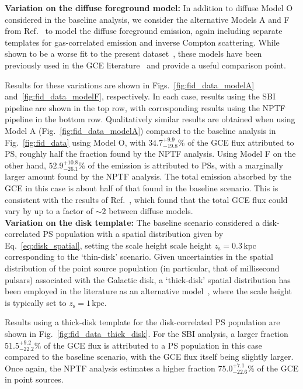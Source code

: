 \documentclass[prd,aps,10pt,nofootinbib,twocolumn,superscriptaddress,preprintnumbers,balancelastpage,longbibliography]{revtex4-1}
\begin{document}
\noindent
\textbf{Variation on the diffuse foreground model:}
In addition to diffuse Model O considered in the baseline analysis, we consider the alternative Models A and F from Ref.~\cite{Calore:2014xka} to model the diffuse foreground emission, again including separate templates for gas-correlated emission and inverse Compton scattering. While shown to be a worse fit to the present dataset~\cite{Buschmann:2020adf}, these models have been previously used in the GCE literature~\cite{Buschmann:2020adf,Leane:2020pfc,Leane:2020nmi} and provide a useful comparison point.

Results for these variations are shown in Figs.~\ref{fig:fid_data_modelA} and~\ref{fig:fid_data_modelF}, respectively. In each case, results using the SBI pipeline are shown in the top row, with corresponding results using the NPTF pipeline in the bottom row. 
Qualitatively similar results are obtained when using Model A (Fig.~\ref{fig:fid_data_modelA}) compared to the baseline analysis in Fig.~\ref{fig:fid_data} using Model O, with $34.7^{+9.9}_{-19.8}\%$ of the GCE flux attributed to PS, roughly half the fraction found by the NPTF analysis. Using Model F on the other hand, $52.9^{+10.8}_{-26.1}\%$ of the emission is attributed to PSs, with a marginally larger amount found by the NPTF analysis. The total emission absorbed by the GCE in this case is about half of that found in the baseline scenario. This is consistent with the results of Ref.~\cite{Buschmann:2020adf}, which found that the total GCE flux could vary by up to a factor of $\sim 2$ between diffuse models. \\

\noindent
\textbf{Variation on the disk template:}
The baseline scenario considered a disk-correlated PS population with a spatial distribution given by Eq.~\eqref{eq:disk_spatial}, setting the scale height scale height $z_\mathrm{s} = 0.3\,\mathrm{kpc}$ corresponding to the `thin-disk' scenario. Given uncertainties in the spatial distribution of the point source population (in particular, that of millisecond pulsars) associated with the Galactic disk, a `thick-disk' spatial distribution has been employed in the literature as an alternative model~\cite{Lee:2015fea,Leane:2019xiy,Buschmann:2020adf}, where the scale height is typically set to $z_\mathrm{s} = 1\,\mathrm{kpc}$. 

Results using a thick-disk template for the disk-correlated PS population are shown in Fig.~\ref{fig:fid_data_thick_disk}. For the SBI analysis, a larger fraction $51.5^{+9.2}_{-22.2}\%$ of the GCE flux is attributed to a PS population in this case compared to the baseline scenario, with the GCE flux itself being slightly larger. Once again, the NPTF analysis estimates a higher fraction $75.0^{+7.1}_{-22.6}\%$ of the GCE in point sources.\\
\end{document}
